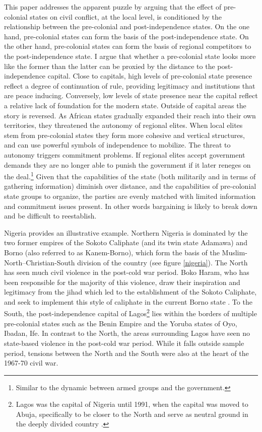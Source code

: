 \documentclass[12pt]{article}
\begin{document}
This paper addresses the apparent puzzle by arguing that the effect of
pre-colonial states on civil conflict, at the local level, is conditioned by the
relationship between the pre-colonial and post-independence states. On the one
hand, pre-colonial states can form the basis of the post-independence state. On
the other hand, pre-colonial states can form the basis of regional competitors
to the post-independence state. I argue that whether a pre-colonial state looks
more like the former than the latter can be proxied by the distance to the
post-independence capital. Close to capitals, high levels of pre-colonial state
presence reflect a degree of continuation of rule, providing legitimacy and
institutions that are peace inducing. Conversely, low levels of state presence
near the capital reflect a relative lack of foundation for the modern state.
Outside of capital areas the story is reversed. As African states gradually
expanded their reach into their own territories, they threatened the autonomy of
regional elites. When local elites stem from pre-colonial states they form more
cohesive and vertical structures, and can use powerful symbols of independence
to mobilize. The threat to autonomy triggers commitment problems. If regional
elites accept government demands they are no longer able to punish the
government if it later reneges on the deal.\footnote{Similar to the dynamic
between armed groups and the government.} Given that the capabilities of the
state (both militarily and in terms of gathering information) diminish over
distance, and the capabilities of pre-colonial state groups to organize, the
parties are evenly matched with limited information and commitment issues
present. In other words bargaining is likely to break down and be difficult to
reestablish.

Nigeria provides an illustrative example. Northern Nigeria is dominated by the
two former empires of the Sokoto Caliphate (and its twin state Adamawa) and
Borno (also referred to as Kanem-Borno), which form the basis of the
Muslim-North--Christian-South division of the country (see figure
\ref{nigeria}). The North has seen much civil violence in the post-cold war
period. Boko Haram, who has been responsible for the majority of this violence,
draw their inspiration and legitimacy from the jihad which led to the
establishment of the Sokoto Caliphate, and seek to implement this style of
caliphate in the current Borno state \citep{Pieri2016}. To the South, the
post-independence capital of Lagos\footnote{Lagos was the capital of Nigeria
until 1991, when the capital was moved to Abuja, specifically to be closer to
the North and serve as neutral ground in the deeply divided country
\citep{Moore_1984}.} lies within the borders of multiple pre-colonial states
such as the Benin Empire and the Yoruba states of Oyo, Ibadan, Ife. In contrast
to the North, the areas surrounding Lagos have seen no state-based violence in
the post-cold war period. While it falls outside sample period, tensions between
the North and the South were also at the heart of the 1967-70 civil war.
\end{document}
